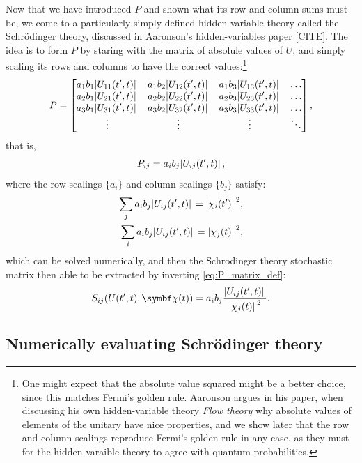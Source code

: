 Now that we have introduced $P$ and shown what its row and column sums must be, we come to a particularly simply defined hidden variable theory called the Schr\"odinger theory, discussed in Aaronson's hidden-variables paper [CITE]. The idea is to form $P$ by staring with the matrix of absolule values of $U$, and simply scaling its rows and columns to have the correct values:\footnote{One might expect that the absolute value squared might be a better choice, since this matches Fermi's golden rule. Aaronson argues in his paper, when discussing his own hidden-variable theory \emph{Flow theory} why absolute values of elements of the unitary have nice properties, and we show later that the row and column scalings reproduce Fermi's golden rule in any case, as they must for the hidden varaible theory to agree with quantum probabilities.}
\begin{align}
P = \left[\begin{matrix}
a_1b_1\abs{U_{11}(t^\prime, t)} & a_1b_2\abs{U_{12}(t^\prime, t)} & a_1b_3\abs{U_{13}(t^\prime, t)}&\hdots\\
a_2b_1\abs{U_{21}(t^\prime, t)} & a_2b_2\abs{U_{22}(t^\prime, t)} & a_2b_3\abs{U_{23}(t^\prime, t)}&\hdots\\
a_3b_1\abs{U_{31}(t^\prime, t)} & a_3b_2\abs{U_{32}(t^\prime, t)} & a_3b_3\abs{U_{33}(t^\prime, t)}&\hdots\\
\vdots & \vdots & \vdots & \ddots
\end{matrix}\right],
\end{align}
that is,
\begin{align}
P_{ij} = a_i b_j \abs{U_{ij}(t^\prime, t)},
\end{align}
where the row scalings $\{a_i\}$ and column scalings $\{b_j\}$ satisfy:
\begin{align}
\sum_j a_i b_j \abs{U_{ij}(t^\prime, t)} = \abs{\chi_i(t^\prime)}^2,\label{eq:a_scalings}\\
\sum_i a_i b_j \abs{U_{ij}(t^\prime, t)} = \abs{\chi_j(t)}^2\label{eq:b_scalings},
\end{align}
which can be solved numerically, and then the Schrodinger theory stochastic matrix then able to be extracted by inverting \eqref{eq:P_matrix_def}:
\begin{align}
S_{ij}(U(t^\prime, t), \vec\chi(t))
= a_i b_j \frac{\abs{U_{ij}(t^\prime, t)}}{\abs{\chi_j(t)}^2}.
\end{align}

\subsection{Numerically evaluating Schr\"odinger theory}

